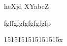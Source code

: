 \documentclass{article}
\begin{document}
  heXjd
  XYabcZ

fgffgfgfgfgfgfgfp

  1515151515151515x
  
\end{document}
